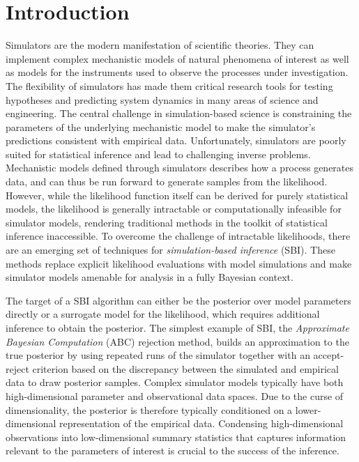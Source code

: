 \section{Introduction}\label{sec:Introduction}


Simulators are the modern manifestation of scientific theories. They can implement complex mechanistic models of natural phenomena of interest as well as models for the instruments used to observe the processes under investigation. The flexibility of simulators has made them critical research tools for testing hypotheses and predicting system dynamics in many areas of science and engineering. The central challenge in simulation-based science is constraining the parameters of the underlying mechanistic model to make the simulator's predictions consistent with empirical data. Unfortunately, simulators are poorly suited for statistical inference and lead to challenging inverse problems. Mechanistic models defined through simulators describes how a process generates data, and can thus be run forward to generate samples from the likelihood. However, while the likelihood function itself can be derived for purely statistical models, the likelihood is generally intractable or computationally infeasible for simulator models, rendering traditional methods in the toolkit of statistical inference inaccessible. To overcome the challenge of intractable likelihoods, there are an emerging set of techniques for \textit{simulation-based inference} (SBI). These methods replace explicit likelihood evaluations with model simulations and make simulator models amenable for analysis in a fully Bayesian context.

The target of a SBI algorithm can either be the posterior over model parameters directly or a surrogate model for the likelihood, which requires additional inference to obtain the posterior. The simplest example of SBI, the \textit{Approximate Bayesian Computation} (ABC) rejection method, builds an approximation to the true posterior by using repeated runs of the simulator together with an accept-reject criterion based on the discrepancy between the simulated and empirical data to draw posterior samples. Complex simulator models typically have both high-dimensional parameter and observational data spaces. Due to the curse of dimensionality, the posterior is therefore typically conditioned on a lower-dimensional representation of the empirical data. Condensing high-dimensional observations into low-dimensional summary statistics that captures information relevant to the parameters of interest is crucial to the success of the inference.

